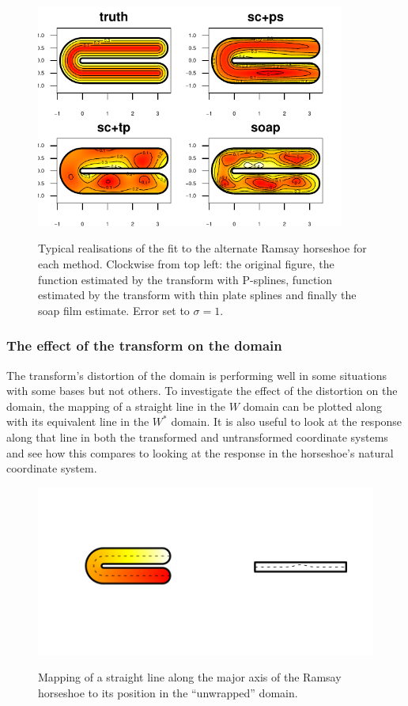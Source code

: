 \begin{figure}
\centering
\includegraphics[width=4in]{sc/figs/altramsaycomp.pdf}\\
\caption{Typical realisations of the fit to the alternate Ramsay horseshoe for each method. Clockwise from top left: the original figure, the function estimated by the \sch transform with P-splines, function estimated by the \sch transform with thin plate splines and finally the soap film estimate. Error set to $\sigma=1$.}
\label{altramsaycomp}
\end{figure}


\subsubsection{The effect of the \sch transform on the domain}

The \sch transform's distortion of the domain is performing well in some situations with some bases but not others. To investigate the effect of the distortion on the domain, the mapping of a straight line in the $W$ domain can be plotted along with its equivalent line in the $W^*$ domain. It is also useful to look at the response along that line in both the transformed and untransformed coordinate systems and see how this compares to looking at the response in the horseshoe's natural coordinate system.

\begin{figure}
\centering
\includegraphics[trim=0.5in 1in 0in 1in]{sc/figs/horseshoecentreline.pdf} \\
\caption{Mapping of a straight line along the major axis of the Ramsay horseshoe to its position in the ``unwrapped'' domain.}
\label{horseshoecentreline}
\end{figure}

